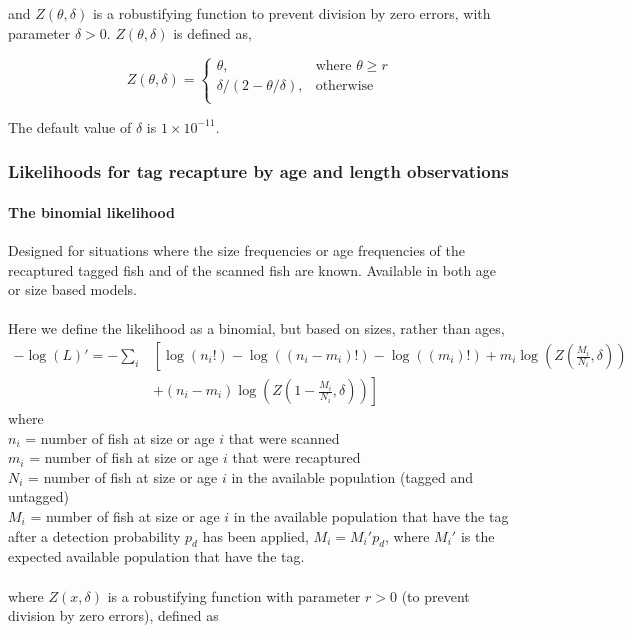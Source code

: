 {{{{and $Z \left(\theta,\delta \right)$ is a robustifying function to prevent division by zero errors, with parameter $\delta>0$. $Z \left(\theta,\delta \right)$ is defined as,

\begin{equation}
Z \left(\theta,\delta \right) = \begin{cases}
\theta, & \text{where $\theta \ge r$} \\
\delta/\left( 2-\theta/\delta \right), & \text{otherwise} \\  
\end{cases}
\end{equation}

The default value of $\delta$ is $1 \times 10^{-11}$.

\subsubsection{Likelihoods for tag recapture by age and length observations}
\paragraph*{The binomial likelihood}
Designed for situations where the size frequencies or age frequencies of the recaptured tagged fish and of the scanned fish are known. Available in both age or size based models.
\\\\
Here we define the likelihood as a binomial, but based on sizes, rather than ages,
\begin{equation}
\begin{split}
-\log \left(L \right)'= -\sum\limits_i & \left[ \right. \log \left(n_i! \right) - \log \left(\left(n_i - m_i \right)! \right) - \log \left(\left(m_i \right)! \right) + m_i \log \left(Z\left(\frac{M_i}{N_i},\delta \right) \right) \\
&+  \left(n_i - m_i \right)\log \left(Z\left(1 - \frac{M_i}{N_i},\delta\right) \right) \left. \right]
\end{split}
\end{equation}
where 
\\
$n_i$ = number of fish at size or age $i$ that were scanned
\\
$m_i$ = number of fish at size or age $i$ that were recaptured
\\
$N_i$ = number of fish at size or age $i$ in the available population (tagged and untagged)
\\
$M_i$ = number of fish at size or age $i$ in the available population that have the tag after a detection probability $p_d$ has been applied, $M_i = M_i'p_d$, where $M_i'$ is the expected available population that have the tag.
\\\\
where $Z(x,\delta)$ is a robustifying function with parameter $r > 0$ (to prevent division by zero errors), defined as


}}}}
